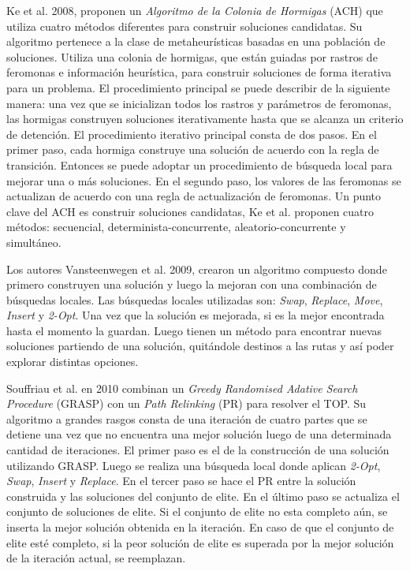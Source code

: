 \bigskip

Ke et al. \cite{KeArchettiFeng} 2008, proponen un \textit{Algoritmo de la Colonia de Hormigas} (ACH) que utiliza cuatro métodos diferentes para construir soluciones candidatas. Su algoritmo pertenece a la clase de metaheurísticas basadas en una población de soluciones. Utiliza una colonia de hormigas, que están guiadas por rastros de feromonas e información heurística, para construir soluciones de forma iterativa para un problema. El procedimiento principal se puede describir de la siguiente manera: una vez que se inicializan todos los rastros y parámetros de feromonas, las hormigas construyen soluciones iterativamente hasta que se alcanza un criterio de detención. El procedimiento iterativo principal consta de dos pasos. En el primer paso, cada hormiga construye una solución de acuerdo con la regla de transición. Entonces se puede adoptar un procedimiento de búsqueda local para mejorar una o más soluciones. En el segundo paso, los valores de las feromonas se actualizan de acuerdo con una regla de actualización de feromonas. Un punto clave del ACH es construir soluciones candidatas, Ke et al. \cite{KeArchettiFeng} proponen cuatro métodos: secuencial, determinista-concurrente, aleatorio-concurrente y simultáneo.

\bigskip

Los autores Vansteenwegen et al. \cite{VansteenwegenSouffriauBergheOudheusden} 2009, crearon un algoritmo compuesto donde primero construyen una solución y luego la mejoran con una combinación de búsquedas locales. Las búsquedas locales utilizadas son: \textit{Swap}, \textit{Replace}, \textit{Move}, \textit{Insert} y \textit{2-Opt}. Una vez que la solución es mejorada, si es la mejor encontrada hasta el momento la guardan. Luego tienen un método para encontrar nuevas soluciones partiendo de una solución, quitándole destinos a las rutas y así poder explorar distintas opciones.

\bigskip

Souffriau et al. \cite{SouffriauVansteenwegenBergheOudheusden} en 2010 combinan un \textit{Greedy Randomised Adative Search Procedure} (GRASP) con un \textit{Path Relinking} (PR) para resolver el TOP. Su algoritmo a grandes rasgos consta de una iteración de cuatro partes que se detiene una vez que no encuentra una mejor solución luego de una determinada cantidad de iteraciones. El primer paso es el de la construcción de una solución utilizando GRASP. Luego se realiza una búsqueda local donde aplican \textit{2-Opt}, \textit{Swap}, \textit{Insert} y \textit{Replace}. En el tercer paso se hace el PR entre la solución construida y las soluciones del conjunto de elite. En el último paso se actualiza el conjunto de soluciones de elite. Si el conjunto de elite no esta completo aún, se inserta la mejor solución obtenida en la iteración. En caso de que el conjunto de elite esté completo, si la peor solución de elite es superada por la mejor solución de la iteración actual, se reemplazan.

